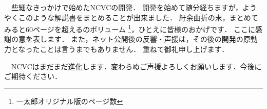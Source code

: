 

\vspace*{2zh}
　些細なきっかけで始めたNCVCの開発．
開発を始めて随分経ちますが，ようやくこのような解説書をまとめることが出来ました．
紆余曲折の末，まとめてみると60ページを超えるのボリューム
\footnote{一太郎オリジナル版のページ数}，ひとえに皆様のおかげです．
ここに感謝の意を表します．
また，ネット公開後の反響・声援は，その後の開発の原動力となったことは言うまでもありません．
重ねて御礼申し上げます．

\vspace*{3zh}
　NCVCはまだまだ進化します．変わらぬご声援よろしくお願いします．今後にご期待ください．
